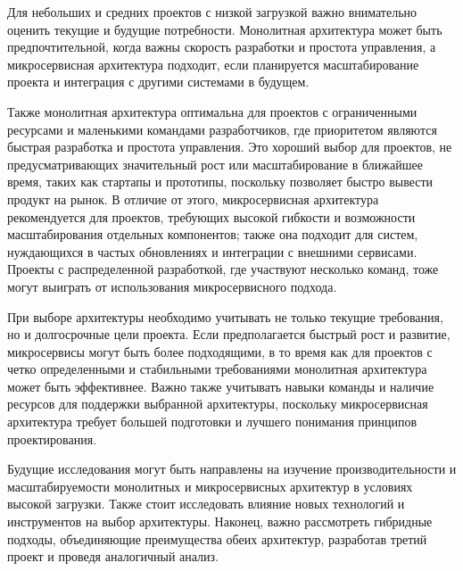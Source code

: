     \medskip
    
    Для небольших и средних проектов с низкой загрузкой важно внимательно оценить текущие и будущие потребности. Монолитная архитектура может быть предпочтительной, когда важны скорость разработки и простота управления, а микросервисная архитектура подходит, если планируется масштабирование проекта и интеграция с другими системами в будущем.
    
    Также монолитная архитектура оптимальна для проектов с ограниченными ресурсами и маленькими командами разработчиков, где приоритетом являются быстрая разработка и простота управления. Это хороший выбор для проектов, не предусматривающих значительный рост или масштабирование в ближайшее время, таких как стартапы и прототипы, поскольку позволяет быстро вывести продукт на рынок. В отличие от этого, микросервисная архитектура рекомендуется для проектов, требующих высокой гибкости и возможности масштабирования отдельных компонентов; также она подходит для систем, нуждающихся в частых обновлениях и интеграции с внешними сервисами. Проекты с распределенной разработкой, где участвуют несколько команд, тоже могут выиграть от использования микросервисного подхода.
    
    При выборе архитектуры необходимо учитывать не только текущие требования, но и долгосрочные цели проекта. Если предполагается быстрый рост и развитие, микросервисы могут быть более подходящими, в то время как для проектов с четко определенными и стабильными требованиями монолитная архитектура может быть эффективнее. Важно также учитывать навыки команды и наличие ресурсов для поддержки выбранной архитектуры, поскольку микросервисная архитектура требует большей подготовки и лучшего понимания принципов проектирования.
    
    Будущие исследования могут быть направлены на изучение производительности и масштабируемости монолитных и микросервисных архитектур в условиях высокой загрузки. Также стоит исследовать влияние новых технологий и инструментов на выбор архитектуры. Наконец, важно рассмотреть гибридные подходы, объединяющие преимущества обеих архитектур, разработав третий проект и проведя аналогичный анализ.
    
    
